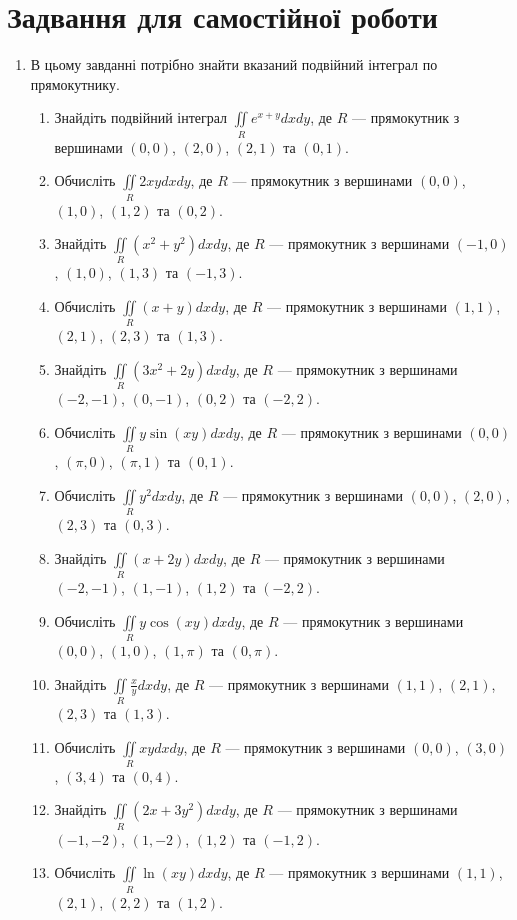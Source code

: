 \chapter{Задвання для самостійної роботи}
\begin{enumerate}
\item  В цьому завданні потрібно знайти вказаний подвійний інтеграл по прямокутнику.
\begin{enumerate}[label*=\arabic*.]
\item    Знайдіть подвійний інтеграл $\iint\limits_R e^{x+y}  dx  dy$, де $R$ --- прямокутник з вершинами $(0,0)$, $(2,0)$, $(2,1)$ та $(0,1)$.
\item     Обчисліть $\iint\limits_{R} 2xy  dx  dy$, де $R$ --- прямокутник з вершинами $(0, 0)$, $(1, 0)$, $(1, 2)$ та $(0, 2)$.
\item     Знайдіть $\iint\limits_{R} (x^2 + y^2)  dx  dy$, де $R$ --- прямокутник з вершинами $(-1, 0)$, $(1, 0)$, $(1, 3)$ та $(-1, 3)$.
\item     Обчисліть $\iint\limits_{R} (x + y)  dx  dy$, де $R$ --- прямокутник з вершинами $(1, 1)$, $(2, 1)$, $(2, 3)$ та $(1, 3)$.
\item     Знайдіть $\iint\limits_{R} (3x^2 + 2y)  dx  dy$, де $R$ --- прямокутник з вершинами $(-2, -1)$, $(0, -1)$, $(0, 2)$ та $(-2, 2)$.
\item     Обчисліть $\iint\limits_{R} y\sin(xy)  dx  dy$, де $R$ --- прямокутник з вершинами $(0, 0)$, $(\pi, 0)$, $(\pi, 1)$ та $(0, 1)$.
\item     Обчисліть $\iint\limits_{R} y^2  dx  dy$, де $R$ --- прямокутник з вершинами $(0, 0)$, $(2, 0)$, $(2, 3)$ та $(0, 3)$.
\item     Знайдіть $\iint\limits_{R} (x + 2y)  dx  dy$, де $R$ --- прямокутник з вершинами $(-2, -1)$, $(1, -1)$, $(1, 2)$ та $(-2, 2)$.
\item     Обчисліть $\iint\limits_{R} y\cos(xy)  dx  dy$, де $R$ --- прямокутник з вершинами $(0, 0)$, $(1, 0)$, $(1, \pi)$ та $(0, \pi)$.
\item     Знайдіть $\iint\limits_{R} \frac{x}{y}  dx  dy$, де $R$ --- прямокутник з вершинами $(1, 1)$, $(2, 1)$, $(2, 3)$ та $(1, 3)$.
\item     Обчисліть $\iint\limits_{R} xy  dx  dy$, де $R$ --- прямокутник з вершинами $(0, 0)$, $(3, 0)$, $(3, 4)$ та $(0, 4)$.
\item     Знайдіть $\iint\limits_{R} (2x + 3y^2)  dx  dy$, де $R$ --- прямокутник з вершинами $(-1, -2)$, $(1, -2)$, $(1, 2)$ та $(-1, 2)$.
\item     Обчисліть $\iint\limits_{R} \ln(xy)  dx  dy$, де $R$ --- прямокутник з вершинами $(1, 1)$, $(2, 1)$, $(2, 2)$ та $(1, 2)$.

\end{enumerate}
\end{enumerate}
